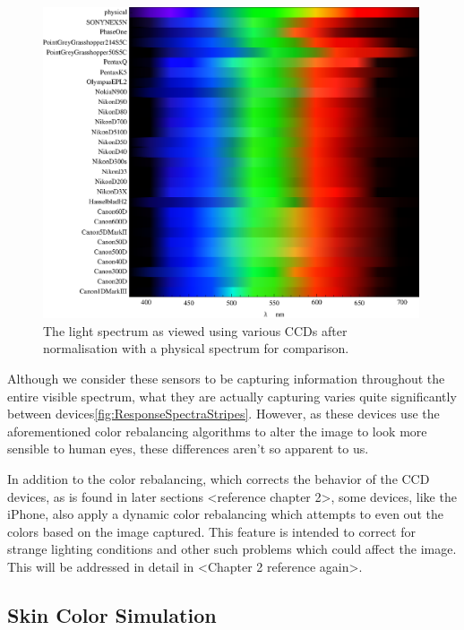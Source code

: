 \begin{figure}[h!]
  \centering
    \includegraphics[width=0.99\textwidth]{Chapter1/Figs/ResponseSpectraStripesNorm.eps}
    \caption{The light spectrum as viewed using various CCDs after normalisation with a physical spectrum for comparison.}  \label{fig:ResponseSpectraStripesNorm}
\end{figure}

Although we consider these sensors to be capturing information throughout the entire visible spectrum, what they are actually capturing varies quite significantly between devices\ref{fig:ResponseSpectraStripes}. However, as these devices use the aforementioned color rebalancing algorithms to alter the image to look more sensible to human eyes, these differences aren't so apparent to us.

In addition to the color rebalancing, which corrects the behavior of the CCD devices, as is found in later sections <reference chapter 2>, some devices, like the iPhone, also apply a dynamic color rebalancing which attempts to even out the colors based on the image captured. This feature is intended to correct for strange lighting conditions and other such problems which could affect the image. This will be addressed in detail in <Chapter 2 reference again>.


\subsection{Skin Color Simulation}

